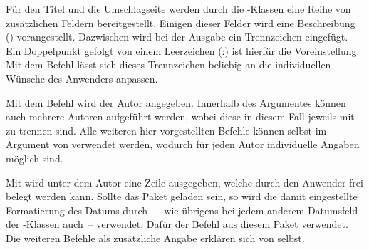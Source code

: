 \begin{Declaration}{}
\printdeclarationlist%
%
Für den Titel und die Umschlagseite werden durch die \TUDScript-Klassen
eine Reihe von zusätzlichen Feldern bereitgestellt. Einigen dieser Felder wird 
eine Beschreibung () vorangestellt. Dazwischen 
wird bei der Ausgabe ein Trennzeichen eingefügt. Ein Doppelpunkt gefolgt von 
einem Leerzeichen (:) ist hierfür die Voreinstellung. Mit 
dem Befehl  lässt sich dieses Trennzeichen beliebig an 
die individuellen Wünsche des Anwenders anpassen.
\end{Declaration}

\begin{Declaration}{}
\begin{Declaration}{}
\begin{Declaration}{}
\begin{Declaration}{}
\begin{Declaration}{}
\begin{Declaration}{}
\printdeclarationlist%
%
%
%
Mit dem Befehl  wird der Autor angegeben. Innerhalb des 
Argumentes können auch mehrere Autoren aufgeführt werden, wobei diese in diesem 
Fall jeweils mit  zu trennen sind. Alle weiteren hier vorgestellten 
Befehle können selbst im Argument von  verwendet werden, wodurch 
für jeden Autor individuelle Angaben möglich sind.

Mit  wird unter dem Autor eine Zeile ausgegeben, welche 
durch den Anwender frei belegt werden kann. Sollte das Paket  
geladen sein, so wird die damit eingestellte Formatierung des Datums durch 
~-- wie übrigens bei jedem anderem Datumsfeld der 
\TUDScript-Klassen auch~-- verwendet. Dafür der Befehl  aus 
diesem Paket verwendet. Die weiteren Befehle als zusätzliche Angabe erklären 
sich von selbst.
\end{Declaration}
\end{Declaration}
\end{Declaration}
\end{Declaration}
\end{Declaration}
\end{Declaration}

